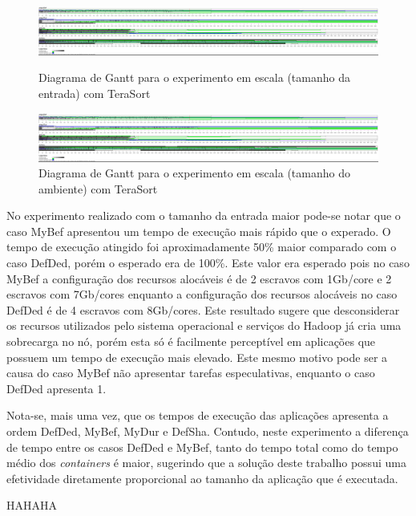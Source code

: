 \begin{figure}
    \centering
	\includegraphics[width=1\textwidth]{figuras/TS-esc-ent.png}
    \caption{Diagrama de Gantt para o experimento em escala (tamanho da entrada) com TeraSort}
	\label{fig:exp3TS}

	\includegraphics[width=1\textwidth]{figuras/TS-esc-ent.png}
    \caption{Diagrama de Gantt para o experimento em escala (tamanho do ambiente) com TeraSort}
	\label{fig:exp31TS}	
\end{figure}



No experimento realizado com o tamanho da entrada maior pode-se notar que o caso MyBef apresentou um tempo de execução mais rápido que o experado. O tempo de execução atingido foi aproximadamente 50\% maior comparado com o caso DefDed, porém o esperado era de 100\%. Este valor era esperado pois no caso MyBef a configuração dos recursos alocáveis é de 2 escravos com 1Gb/core e 2 escravos com 7Gb/cores enquanto a configuração dos recursos alocáveis no caso DefDed é de 4 escravos com 8Gb/cores. Este resultado sugere que desconsiderar os recursos utilizados pelo sistema operacional e serviços do Hadoop já cria uma sobrecarga no nó, porém esta só é facilmente perceptível em aplicações que possuem um tempo de execução mais elevado. Este mesmo motivo pode ser a causa do caso MyBef não apresentar tarefas especulativas, enquanto o caso DefDed apresenta 1.

Nota-se, mais uma vez, que os tempos de execução das aplicações apresenta a ordem DefDed, MyBef, MyDur e DefSha. Contudo, neste experimento a diferença de tempo entre os casos DefDed e MyBef, tanto do tempo total como do tempo médio dos \textit{containers} é maior, sugerindo que a solução deste trabalho possui uma efetividade diretamente proporcional ao tamanho da aplicação que é executada.

HAHAHA


